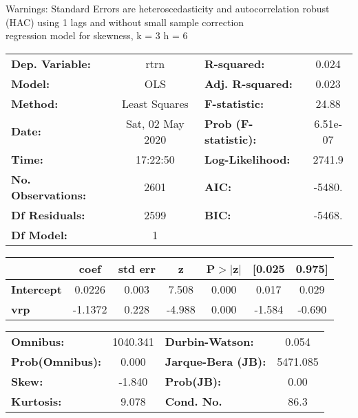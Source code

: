 Warnings: \newline
 [1] Standard Errors are heteroscedasticity and autocorrelation robust (HAC) using 1 lags and without small sample correction\\ 

regression model for skewness, k = 3 h = 6\begin{center}
\begin{tabular}{lclc}
\toprule
\textbf{Dep. Variable:}    &       rtrn       & \textbf{  R-squared:         } &     0.024   \\
\textbf{Model:}            &       OLS        & \textbf{  Adj. R-squared:    } &     0.023   \\
\textbf{Method:}           &  Least Squares   & \textbf{  F-statistic:       } &     24.88   \\
\textbf{Date:}             & Sat, 02 May 2020 & \textbf{  Prob (F-statistic):} &  6.51e-07   \\
\textbf{Time:}             &     17:22:50     & \textbf{  Log-Likelihood:    } &    2741.9   \\
\textbf{No. Observations:} &        2601      & \textbf{  AIC:               } &    -5480.   \\
\textbf{Df Residuals:}     &        2599      & \textbf{  BIC:               } &    -5468.   \\
\textbf{Df Model:}         &           1      & \textbf{                     } &             \\
\bottomrule
\end{tabular}
\begin{tabular}{lcccccc}
                   & \textbf{coef} & \textbf{std err} & \textbf{z} & \textbf{P$> |$z$|$} & \textbf{[0.025} & \textbf{0.975]}  \\
\midrule
\textbf{Intercept} &       0.0226  &        0.003     &     7.508  &         0.000        &        0.017    &        0.029     \\
\textbf{vrp}       &      -1.1372  &        0.228     &    -4.988  &         0.000        &       -1.584    &       -0.690     \\
\bottomrule
\end{tabular}
\begin{tabular}{lclc}
\textbf{Omnibus:}       & 1040.341 & \textbf{  Durbin-Watson:     } &    0.054  \\
\textbf{Prob(Omnibus):} &   0.000  & \textbf{  Jarque-Bera (JB):  } & 5471.085  \\
\textbf{Skew:}          &  -1.840  & \textbf{  Prob(JB):          } &     0.00  \\
\textbf{Kurtosis:}      &   9.078  & \textbf{  Cond. No.          } &     86.3  \\
\bottomrule
\end{tabular}
\end{center}

